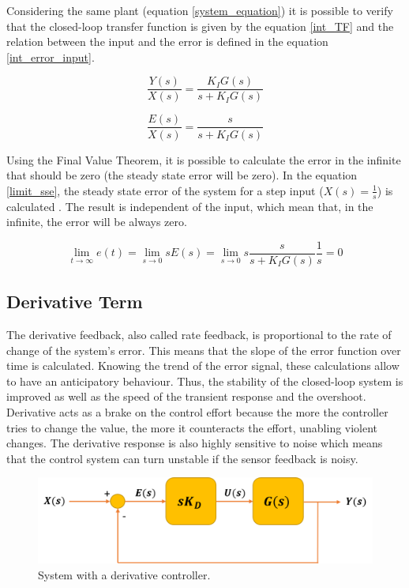 Considering the same plant (equation \ref{system_equation}) it is possible to verify that the closed-loop transfer function is given by the equation \ref{int_TF} and the relation between the input and the error is defined in the equation \ref{int_error_input}.

\begin{equation}\label{int_TF}
\frac{Y(s)}{X(s)}= \frac{K_IG(s)}{s + K_IG(s)}
\end{equation}

\begin{equation}\label{int_error_input}
\frac{E(s)}{X(s)}= \frac{s}{s + K_IG(s)}
\end{equation}

Using the Final Value Theorem, it is possible to calculate the error in the infinite that should be zero (the steady state error will be zero). In the equation \ref{limit_sse}, the steady state error of the system for a step input ($X(s)=\frac{1}{s}$) is calculated . The result is independent of the input, which mean that, in the infinite, the error will be always zero.

\begin{equation}\label{limit_sse}
\lim_{t\to\infty} e(t) = \lim_{s \to 0} sE(s) = \lim_{s \to 0} s\frac{s}{s + K_IG(s)}\frac{1}{s} = 0
\end{equation}

\subsection*{Derivative Term}

The derivative feedback, also called rate feedback, is proportional to the rate of change of the system's error. This means that the slope of the error function over time is calculated. Knowing the trend of the error signal, these calculations allow to have an anticipatory behaviour. Thus, the stability of the closed-loop system is improved as well as the speed of the transient response and the overshoot. Derivative acts as a brake on the control effort because the more the controller tries to change the value, the more it counteracts the effort, unabling violent changes. The derivative response is also highly sensitive to noise which means that the control system can turn unstable if the sensor feedback is noisy. 

\begin{figure}[H]
	\centering
	\includegraphics[scale=0.6]{figures/deriv_controller.png}
	\caption{System with a derivative controller.}
	\label{deriv_controller}
\end{figure}

